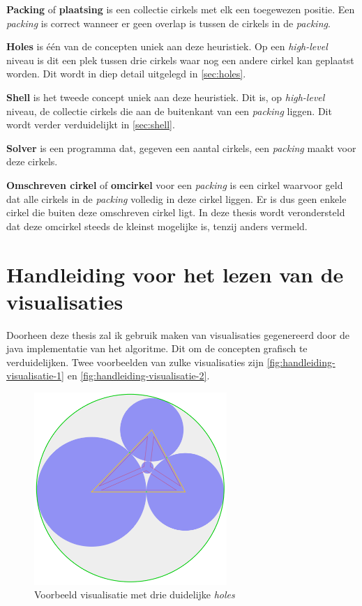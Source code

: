 \documentclass[12pt,a4paper,oneside]{book}
\begin{document}
\textbf{Packing} of \textbf{plaatsing} is een collectie cirkels met elk een toegewezen positie. Een \textit{packing} is correct wanneer er geen overlap is tussen de cirkels in de \textit{packing}.

\textbf{Holes} is één van de concepten uniek aan deze heuristiek. Op een \textit{high-level} niveau is dit een plek tussen drie cirkels waar nog een andere cirkel kan geplaatst worden. Dit wordt in diep detail uitgelegd in \autoref{sec:holes}.

\textbf{Shell} is het tweede concept uniek aan deze heuristiek. Dit is, op \textit{high-level} niveau, de collectie cirkels die aan de buitenkant van een \textit{packing} liggen. Dit wordt verder verduidelijkt in \autoref{sec:shell}.

\textbf{Solver} is een programma dat, gegeven een aantal cirkels, een \textit{packing} maakt voor deze cirkels.

\textbf{Omschreven cirkel} of \textbf{omcirkel} voor een \textit{packing} is een cirkel waarvoor geld dat alle cirkels in de \textit{packing} volledig in deze cirkel liggen.
Er is dus geen enkele cirkel die buiten deze omschreven cirkel ligt.
In deze thesis wordt verondersteld dat deze omcirkel steeds de kleinst mogelijke is, tenzij anders vermeld.

\chapter{Handleiding voor het lezen van de visualisaties} \label{chap:handleiding-visualisaties}

Doorheen deze thesis zal ik gebruik maken van visualisaties gegenereerd door de java implementatie van het algoritme.
Dit om de concepten grafisch te verduidelijken.
Twee voorbeelden van zulke visualisaties zijn \autoref{fig:handleiding-visualisatie-1} en \autoref{fig:handleiding-visualisatie-2}.

\begin{figure}
  \centering
  \includegraphics[width=0.65\textwidth]{handleiding-visualisatie-1.png}
  \caption{Voorbeeld visualisatie met drie duidelijke \textit{holes}} \label{fig:handleiding-visualisatie-1}
\end{figure}
\end{document}
